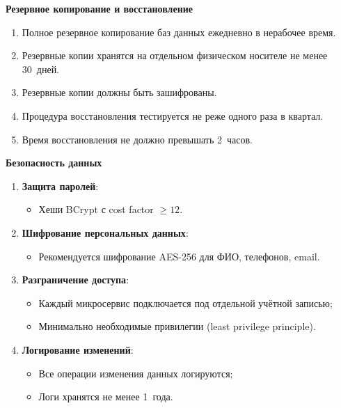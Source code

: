 \documentclass{bmstu}
\begin{document}
\begin{center}
    \textbf{Резервное копирование и восстановление}
\end{center}

\begin{enumerate}
    \item Полное резервное копирование баз данных ежедневно в нерабочее время.
    
    \item Резервные копии хранятся на отдельном физическом носителе не менее 30~дней.
    
    \item Резервные копии должны быть зашифрованы.
    
    \item Процедура восстановления тестируется не реже одного раза в квартал.
    
    \item Время восстановления не должно превышать 2~часов.
\end{enumerate}

\begin{center}
    \textbf{Безопасность данных}
\end{center}

\begin{enumerate}
    \item \textbf{Защита паролей}:
    \begin{itemize}
        \item Хеши BCrypt с cost factor $\geq 12$.
    \end{itemize}
    
    \item \textbf{Шифрование персональных данных}:
    \begin{itemize}
        \item Рекомендуется шифрование AES-256 для ФИО, телефонов, email.
    \end{itemize}
    
    \item \textbf{Разграничение доступа}:
    \begin{itemize}
        \item Каждый микросервис подключается под отдельной учётной записью;
        \item Минимально необходимые привилегии (least privilege principle).
    \end{itemize}
    
    \item \textbf{Логирование изменений}:
    \begin{itemize}
        \item Все операции изменения данных логируются;
        \item Логи хранятся не менее 1~года.
    \end{itemize}
\end{enumerate}
\end{document}
